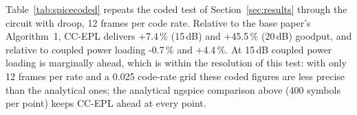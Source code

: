 Table~\ref{tab:spicecoded} repeats the coded test of Section~\ref{sec:results} through the circuit with droop, 12 frames per code rate. Relative to the base paper's Algorithm~1, CC-EPL delivers +7.4\,\% (15\,dB) and +45.5\,\% (20\,dB) goodput, and relative to coupled power loading -0.7\,\% and +4.4\,\%. At 15\,dB coupled power loading is marginally ahead, which is within the resolution of this test: with only 12 frames per rate and a 0.025 code-rate grid these coded figures are less precise than the analytical ones; the analytical ngspice comparison above (400 symbols per point) keeps CC-EPL ahead at every point.
